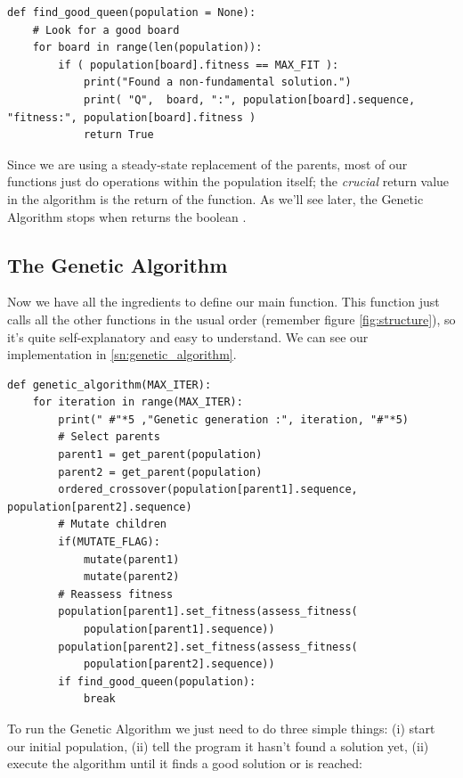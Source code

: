 
\begin{lstlisting}[label=sn:find_good_queen, caption=Function to stop the program when we find a good solution]
def find_good_queen(population = None):
	# Look for a good board
	for board in range(len(population)):
		if ( population[board].fitness == MAX_FIT ):
			print("Found a non-fundamental solution.")
			print( "Q",  board, ":", population[board].sequence, "fitness:", population[board].fitness )
			return True
\end{lstlisting}

Since we are using a steady-state replacement of the parents, most of our functions just do operations within the population itself; the \emph{crucial} return value in the algorithm is the return of the  function. As we'll see later, the Genetic Algorithm stops when  returns the boolean .

\subsection{The Genetic Algorithm}\label{sec:genetic-algorithm}
Now we have all the ingredients to define our main  function. This function just calls all the other functions in the usual order (remember figure \ref{fig:structure}), so it's quite self-explanatory and easy to understand. We can see our implementation in \cref{sn:genetic_algorithm}.

\begin{lstlisting}[label=sn:genetic_algorithm, caption=The Genetic Algorithm]
def genetic_algorithm(MAX_ITER):
	for iteration in range(MAX_ITER):
		print(" #"*5 ,"Genetic generation :", iteration, "#"*5)
		# Select parents
		parent1 = get_parent(population)
		parent2 = get_parent(population)
		ordered_crossover(population[parent1].sequence, population[parent2].sequence)
		# Mutate children
		if(MUTATE_FLAG):
			mutate(parent1)
			mutate(parent2)
		# Reassess fitness
		population[parent1].set_fitness(assess_fitness(
			population[parent1].sequence))
		population[parent2].set_fitness(assess_fitness(
			population[parent2].sequence))
		if find_good_queen(population):
			break
\end{lstlisting}

To run the Genetic Algorithm we just need to do three simple things: (i) start our initial population, (ii) tell the program it hasn't found a solution yet, (ii) execute the algorithm until it finds a good solution or  is reached:

